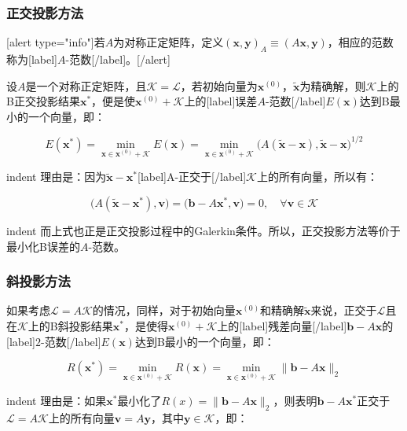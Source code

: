 \documentclass[UTF8,nofonts]{ctexart}
\begin{document}
\subsubsection*{正交投影方法}

[alert type="info"]若$A$为对称正定矩阵，定义$(\boldsymbol{x},\boldsymbol{y})_A\equiv(A\boldsymbol{x},\boldsymbol{y})$，相应的范数称为[label]$A$-范数[/label]。[/alert]

设$A$是一个对称正定矩阵，且$\mathcal{K}=\mathcal{L}$，若初始向量为$\boldsymbol{x}^{(0)}$，$\tilde{\boldsymbol{x}}$为精确解，则$\mathcal{K}$上的B正交投影结果$\boldsymbol{x}^\ast$，便是使$\boldsymbol{x}^{(0)}+\mathcal{K}$上的[label]误差$A$-范数[/label]$E(\boldsymbol{x})$达到B最小的一个向量，即：

\[
E(\boldsymbol{x}^\ast)=\min_{\boldsymbol{x}\in\boldsymbol{x}^{(0)}+\mathcal{K}}E(\boldsymbol{x})=\min_{\boldsymbol{x}\in\boldsymbol{x}^{(0)}+\mathcal{K}}\big(A(\tilde{\boldsymbol{x}}-\boldsymbol{x}),\tilde{\boldsymbol{x}}-\boldsymbol{x}\big)^{1/2}
\]

indent 理由是：因为$\tilde{\boldsymbol{x}}-\boldsymbol{x}^\ast$[label]A-正交于[/label]$\mathcal{K}$上的所有向量，所以有：

\[
\big(A(\tilde{\boldsymbol{x}}-\boldsymbol{x}^\ast),\boldsymbol{v}\big)=\big(\boldsymbol{b}-A\boldsymbol{x}^\ast,\boldsymbol{v}\big)=0,\quad\forall\boldsymbol{v}\in\mathcal{K}
\]

indent 而上式也正是正交投影过程中的Galerkin条件。所以，正交投影方法等价于最小化B误差的$A$-范数。

\subsubsection*{斜投影方法}

如果考虑$\mathcal{L}=A\mathcal{K}$的情况，同样，对于初始向量$\boldsymbol{x}^{(0)}$和精确解$\tilde{\boldsymbol{x}}$来说，正交于$\mathcal{L}$且在$\mathcal{K}$上的B斜投影结果$\boldsymbol{x}^\ast$，是使得$\boldsymbol{x}^{(0)}+\mathcal{K}$上的[label]残差向量[/label]$\boldsymbol{b}-A\boldsymbol{x}$的[label]$2$-范数[/label]$E(\boldsymbol{x})$达到B最小的一个向量，即：

\[
R(\boldsymbol{x}^\ast)=\min_{\boldsymbol{x}\in\boldsymbol{x}^{(0)}+\mathcal{K}}R(\boldsymbol{x})=\min_{\boldsymbol{x}\in\boldsymbol{x}^{(0)}+\mathcal{K}}\|\boldsymbol{b}-A\boldsymbol{x}\|_2
\]

indent 理由是：如果$\boldsymbol{x}^\ast$最小化了$R(x)=\|\boldsymbol{b}-A\boldsymbol{x}\|_2$，则表明$\boldsymbol{b}-A\boldsymbol{x}^\ast$正交于$\mathcal{L}=A\mathcal{K}$上的所有向量$\boldsymbol{v}=A\boldsymbol{y}$，其中$\boldsymbol{y}\in\mathcal{K}$，即：
\end{document}
